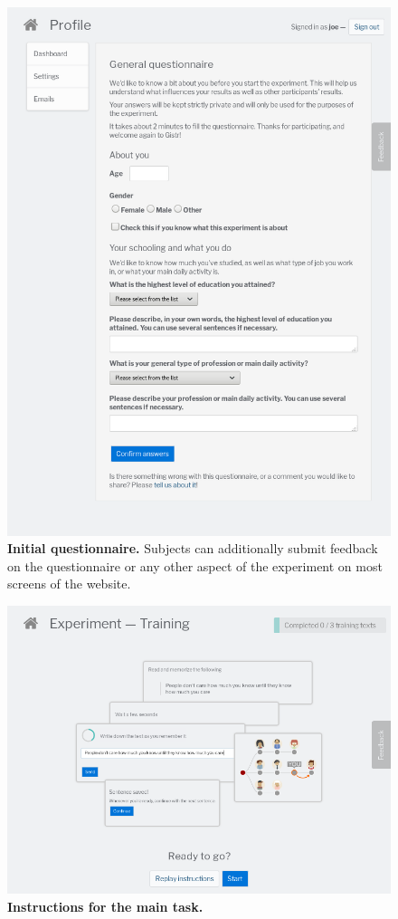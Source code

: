 \begin{figure}[!ht]
  \centering
  \includegraphics[width=.9\linewidth]{images/manual/gistr-questionnaire.png}
  \caption[Initial questionnaire]{
  \textbf{Initial questionnaire.}
  Subjects can additionally submit feedback on the questionnaire or any other aspect of the experiment on most screens of the website.
  }
  \label{fig:gistr-questionnaire}
\end{figure}

\begin{figure}[!ht]
  \centering
  \includegraphics[width=.75\linewidth]{images/manual/gistr-instructions-training.png}
  \caption[Instructions for the main task]{
  \textbf{Instructions for the main task.}
  }
  \label{fig:gistr-instructions}
\end{figure}

